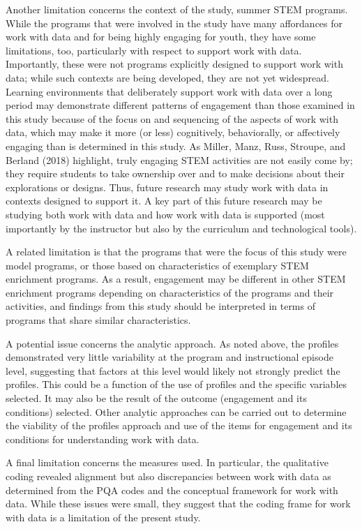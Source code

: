 \documentclass[]{book}
\theoremstyle{definition}
\theoremstyle{definition}
\theoremstyle{definition}
\theoremstyle{remark}
\begin{document}
Another limitation concerns the context of the study, summer STEM
programs. While the programs that were involved in the study have many
affordances for work with data and for being highly engaging for youth,
they have some limitations, too, particularly with respect to support
work with data. Importantly, these were not programs explicitly designed
to support work with data; while such contexts are being developed, they
are not yet widespread. Learning environments that deliberately support
work with data over a long period may demonstrate different patterns of
engagement than those examined in this study because of the focus on and
sequencing of the aspects of work with data, which may make it more (or
less) cognitively, behaviorally, or affectively engaging than is
determined in this study. As Miller, Manz, Russ, Stroupe, and Berland
(2018) highlight, truly engaging STEM activities are not easily come by;
they require students to take ownership over and to make decisions about
their explorations or designs. Thus, future research may study work with
data in contexts designed to support it. A key part of this future
research may be studying both work with data and how work with data is
supported (most importantly by the instructor but also by the curriculum
and technological tools).

A related limitation is that the programs that were the focus of this
study were model programs, or those based on characteristics of
exemplary STEM enrichment programs. As a result, engagement may be
different in other STEM enrichment programs depending on characteristics
of the programs and their activities, and findings from this study
should be interpreted in terms of programs that share similar
characteristics.

A potential issue concerns the analytic approach. As noted above, the
profiles demonstrated very little variability at the program and
instructional episode level, suggesting that factors at this level would
likely not strongly predict the profiles. This could be a function of
the use of profiles and the specific variables selected. It may also be
the result of the outcome (engagement and its conditions) selected.
Other analytic approaches can be carried out to determine the viability
of the profiles approach and use of the items for engagement and its
conditions for understanding work with data.

A final limitation concerns the measures used. In particular, the
qualitative coding revealed alignment but also discrepancies between
work with data as determined from the PQA codes and the conceptual
framework for work with data. While these issues were small, they
suggest that the coding frame for work with data is a limitation of the
present study.
\end{document}
